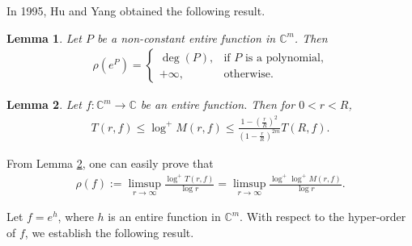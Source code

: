 \documentclass[11pt, reqno]{amsart}
\newtheorem{lem}{Lemma}[section]
\numberwithin{equation}{section}
\begin{document}
In 1995, Hu and Yang \cite{hy1} obtained the following result.
\begin{lem}\label{2A}\cite[Proposition 3.2]{hy1} Let $P$ be a non-constant entire function in $\mathbb{C}^m$. Then 
\begin{align*}
\rho(e^P)=
\begin{cases}
\deg(P), & \text{if $P$ is a polynomial,}\\
+\infty, & \text{otherwise.}
\end{cases}
\end{align*}
\end{lem}


\begin{lem}\cite[Lemma 2.5.24]{Noguchi-Winkelmann}\label{l2.1} Let $f:\mathbb{C}^m\to \mathbb{C}$ be an entire function. Then for $0<r<R$,
\begin{align*}
T(r,f)\leq \log^+ M(r,f)\leq \frac{1-\left(\frac{r}{R}\right)^2}{\left(1-\frac{r}{R}\right)^{2m}}T(R,f).
\end{align*}
\end{lem}

From Lemma \ref{l2.1}, one can easily prove that
\begin{align*}
\rho(f):=\limsup _{r \rightarrow \infty} \frac{\log^+ T(r, f)}{\log r}=\limsup _{r \rightarrow \infty} \frac{\log^+ \log^+ M(r, f)}{\log r}.
\end{align*}

Let $f=e^{h}$, where $h$ is an entire function in $\mathbb{C}^m$. With respect to the hyper-order of $f$, we establish the following result.
\end{document}
